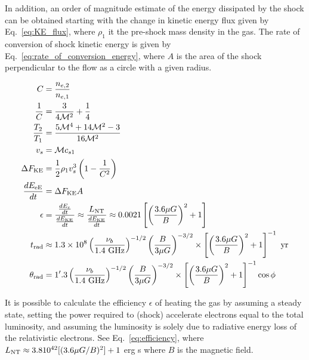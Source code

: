 \documentclass[MScProj_TLRH_ClusterEnergy.tex]{subfiles}
\begin{document}
In addition, an order of magnitude estimate of the energy dissipated by the shock can be obtained starting with the change in kinetic energy flux given by Eq.~\ref{eq:KE_flux}, where $\rho_1$ it the pre-shock mass density in the gas.
The rate of conversion of shock kinetic energy is given by Eq.~\ref{eq:rate_of_conversion_energy}, where $A$ is the area of the shock perpendicular to the flow as a circle with a given radius.

\begin{align}
    C &= \frac{n_{e,2}}{n_{e,1}} \label{eq:compression} \\
    \frac{1}{C} &= \frac{3}{4 \mathcal{M}^2} + \frac{1}{4} \label{eq:shock_condition} \\
    \frac{T_2}{T_1} &= \frac{5 \mathcal{M}^4 + 14 \mathcal{M}^2 - 3}{16 \mathcal{M}^2} \label{eq:jump_condition} \\
    v_s &= \mathcal{M} c_{s1} \label{eq:shock_speed} \\
    \Delta F_{\rm KE} &= \frac{1}{2} \rho_1 v_s^3 \left( 1 - \frac{1}{C^2} \right ) \label{eq:KE_flux} \\
    \frac{dE_{\rm eE}}{dt} &= \Delta F_{\rm KE} A \label{eq:rate_of_conversion_energy} \\
    \epsilon &= \frac{\frac{dE_e}{dt}}{\frac{dE_{\rm KE}}{dt}} \approx \frac{L_{\rm NT}}{\frac{dE_{\rm KE}}{dt}} \approx 0.0021 \left[ \left( \frac{3.6 \mu G}{B} \right)^2 +1 \right] \label{eq:efficiency} \\
    t_{\rm rad} &\approx 1.3 \times 10^8 \left( \frac{\nu_b}{1.4 \text{ GHz}}\right)^{-1/2} \left( \frac{B}{3 \mu G} \right)^{-3/2} \times \left[ \left( \frac{3.6 \mu G}{B} \right)^2 +1 \right]^{-1} \text{ yr}  \label{eq:electron_age} \\
    \theta_{\rm rad} &= 1'.3 \left( \frac{\nu_b}{1.4 \text{ GHz}} \right)^{-1/2} \left( \frac{B}{3 \mu G} \right)^{-3/2} \times \left[ \left( \frac{3.6 \mu G}{B} \right)^2 +1 \right]^{-1} \cos \phi \label{eq:projected_distance}
\end{align}

It is possible to calculate the efficiency $\epsilon$ of heating the gas by assuming a steady state, setting the power required to (shock) accelerate electrons equal to the total luminosity, and assuming the luminosity is solely due to radiative energy loss of the relativistic electrons. See Eq.~\ref{eq:efficiency}, where $L_{\rm NT} \approx 3.8 10^{42} [(3.6 \mu G/B)^2] + 1$ erg s where $B$ is the magnetic field.
 
\end{document}
